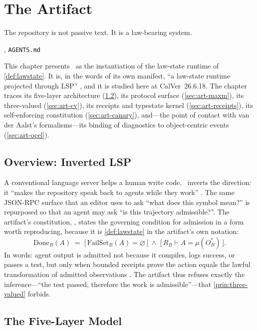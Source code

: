 \chapter{The \texorpdfstring{\lspmax}{lsp-max} Artifact}
\label{ch:artifact}

\epigraph{The repository is not passive text. It is a law-bearing
system.}{\textit{\lspmax}, \texttt{AGENTS.md}}

This chapter presents \lspmax\ as the instantiation of the law-state runtime of
\cref{def:lawstate}. It is, in the words of its own manifest, ``a law-state
runtime projected through LSP'' \citep{lspmax}, and it is studied here at
CalVer~26.6.18. The chapter traces its five-layer architecture
(\cref{sec:art-layers}), its \maxm{*} protocol surface (\cref{sec:art-maxm}), its
three-valued  (\cref{sec:art-cv}), its receipts and
typestate kernel (\cref{sec:art-receipts}), its self-enforcing constitution
(\cref{sec:art-canary}), and---the point of contact with van der Aalst's
formalisms---its binding of diagnostics to object-centric events
(\cref{sec:art-ocel}).

\section{Overview: Inverted LSP}
\label{sec:art-overview}

A conventional language server helps a human write code. \lspmax\ inverts the
direction: it ``makes the repository speak back to agents while they work''
\citep{lspmax}. The same JSON-RPC surface that an editor uses to ask ``what does
this symbol mean?'' is repurposed so that an agent may ask ``is this trajectory
admissible?''. The artifact's constitution, , states the governing
condition for admission in a form worth reproducing, because it is
\cref{def:lawstate} in the artifact's own notation:
\[
  \mathrm{Do{n}e}_B(A) \;=\; \big[\,\mathrm{FailSet}_B(A)=\varnothing\,\big]
  \;\wedge\; \big[\,R_B \vdash A = \mu(O^{*}_B)\,\big].
\]
In words: agent output is admitted not because it compiles, logs success, or
passes a test, but only when bounded receipts prove the action equals the lawful
transformation of admitted observations \citep{lspmax}. The artifact thus refuses
exactly the inference---``the test passed, therefore the work is admissible''---that
\cref{prin:three-valued} forbids.

\section{The Five-Layer Model}
\label{sec:art-layers}

